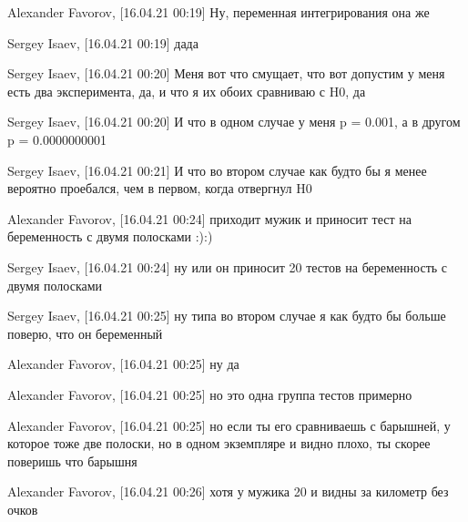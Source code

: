 \documentclass{book}
\begin{document}
Alexander Favorov, [16.04.21 00:19]
Ну, переменная интегрирования она же

Sergey Isaev, [16.04.21 00:19]
дада

Sergey Isaev, [16.04.21 00:20]
Меня вот что смущает, что вот допустим у меня есть два эксперимента, да, и что я их обоих сравниваю с H0, да

Sergey Isaev, [16.04.21 00:20]
И что в одном случае у меня p = 0.001, а в другом p = 0.0000000001

Sergey Isaev, [16.04.21 00:21]
И что во втором случае как будто бы я менее вероятно проебался, чем в первом, когда отвергнул H0

Alexander Favorov, [16.04.21 00:24]
приходит мужик и приносит тест на беременность с двумя полосками :):)

Sergey Isaev, [16.04.21 00:24]
ну или он приносит 20 тестов на беременность с двумя полосками

Sergey Isaev, [16.04.21 00:25]
ну типа во втором случае я как будто бы больше поверю, что он беременный

Alexander Favorov, [16.04.21 00:25]
ну да

Alexander Favorov, [16.04.21 00:25]
но это одна группа тестов примерно

Alexander Favorov, [16.04.21 00:25]
но если ты его сравниваешь с барышней, у которое тоже две полоски, но в одном экземпляре и видно плохо, ты скорее поверишь что барышня

Alexander Favorov, [16.04.21 00:26]
хотя у мужика 20 и видны за километр без очков
\end{document}
